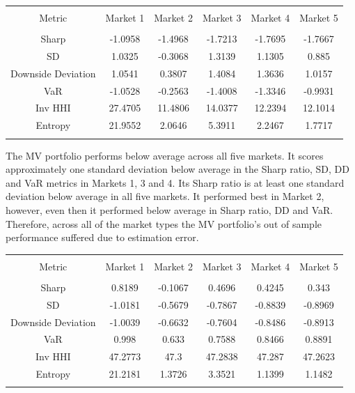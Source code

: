 \documentclass[11pt,preprint, authoryear]{elsarticle}
\let\origtable\table
\let\endorigtable\endtable
\renewenvironment{table}[1][2] {
    \expandafter\origtable\expandafter[H]
} {
    \endorigtable
}
\numberwithin{equation}{section}
\numberwithin{figure}{section}
\numberwithin{table}{section}
\begin{document}
\begin{table}[!htbp] \centering 
  \caption{Minimum Variance} 
  \label{mv} 
\begin{tabular}{@{\extracolsep{5pt}} cccccc} 
\\[-1.8ex]\hline 
\hline \\[-1.8ex] 
Metric & Market 1 & Market 2 & Market 3 & Market 4 & Market 5 \\ 
\hline \\[-1.8ex] 
Sharp & -1.0958 & -1.4968 & -1.7213 & -1.7695 & -1.7667 \\ 
SD & 1.0325 & -0.3068 & 1.3139 & 1.1305 & 0.885 \\ 
Downside Deviation & 1.0541 & 0.3807 & 1.4084 & 1.3636 & 1.0157 \\ 
VaR & -1.0528 & -0.2563 & -1.4008 & -1.3346 & -0.9931 \\ 
Inv HHI & 27.4705 & 11.4806 & 14.0377 & 12.2394 & 12.1014 \\ 
Entropy & 21.9552 & 2.0646 & 5.3911 & 2.2467 & 1.7717 \\ 
\hline \\[-1.8ex] 
\end{tabular} 
\end{table}

The MV portfolio performs below average across all five markets. It
scores approximately one standard deviation below average in the Sharp
ratio, SD, DD and VaR metrics in Markets 1, 3 and 4. Its Sharp ratio is
at least one standard deviation below average in all five markets. It
performed best in Market 2, however, even then it performed below
average in Sharp ratio, DD and VaR. Therefore, across all of the market
types the MV portfolio's out of sample performance suffered due to
estimation error.

\begin{table}[!htbp] \centering 
  \caption{Inverse Volatility} 
  \label{iv} 
\begin{tabular}{@{\extracolsep{5pt}} cccccc} 
\\[-1.8ex]\hline 
\hline \\[-1.8ex] 
Metric & Market 1 & Market 2 & Market 3 & Market 4 & Market 5 \\ 
\hline \\[-1.8ex] 
Sharp & 0.8189 & -0.1067 & 0.4696 & 0.4245 & 0.343 \\ 
SD & -1.0181 & -0.5679 & -0.7867 & -0.8839 & -0.8969 \\ 
Downside Deviation & -1.0039 & -0.6632 & -0.7604 & -0.8486 & -0.8913 \\ 
VaR & 0.998 & 0.633 & 0.7588 & 0.8466 & 0.8891 \\ 
Inv HHI & 47.2773 & 47.3 & 47.2838 & 47.287 & 47.2623 \\ 
Entropy & 21.2181 & 1.3726 & 3.3521 & 1.1399 & 1.1482 \\ 
\hline \\[-1.8ex] 
\end{tabular} 
\end{table}
\end{document}
